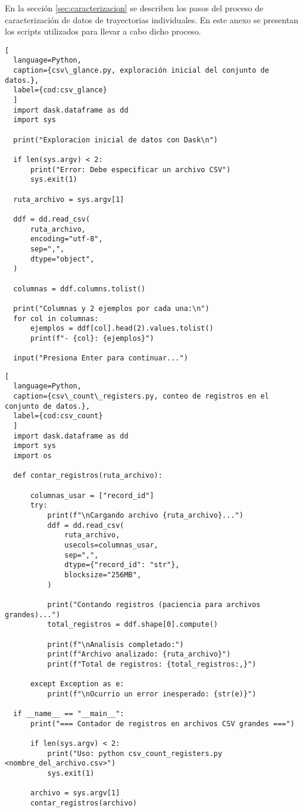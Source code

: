 \label{anexo:scripts}

En la sección \ref{sec:caracterizacion} se describen los pasos del proceso de caracterización de datos de trayectorias individuales. En este anexo se presentan los scripts utilizados para llevar a cabo dicho proceso.

\begin{lstlisting}[
  language=Python,
  caption={csv\_glance.py, exploración inicial del conjunto de datos.},
  label={cod:csv_glance}
  ]
  import dask.dataframe as dd
  import sys 

  print("Exploracion inicial de datos con Dask\n")

  if len(sys.argv) < 2:
      print("Error: Debe especificar un archivo CSV")
      sys.exit(1)

  ruta_archivo = sys.argv[1]

  ddf = dd.read_csv(
      ruta_archivo,
      encoding="utf-8",  
      sep=",",           
      dtype="object",    
  )

  columnas = ddf.columns.tolist()

  print("Columnas y 2 ejemplos por cada una:\n")
  for col in columnas:
      ejemplos = ddf[col].head(2).values.tolist()
      print(f"- {col}: {ejemplos}")

  input("Presiona Enter para continuar...")
\end{lstlisting}
\vfill

\begin{lstlisting}[
  language=Python,
  caption={csv\_count\_registers.py, conteo de registros en el conjunto de datos.},
  label={cod:csv_count}
  ] 
  import dask.dataframe as dd
  import sys
  import os

  def contar_registros(ruta_archivo):

      columnas_usar = ["record_id"]
      try:
          print(f"\nCargando archivo {ruta_archivo}...")
          ddf = dd.read_csv(
              ruta_archivo,
              usecols=columnas_usar,
              sep=",",
              dtype={"record_id": "str"},
              blocksize="256MB",
          )

          print("Contando registros (paciencia para archivos grandes)...")
          total_registros = ddf.shape[0].compute()

          print(f"\nAnalisis completado:")
          print(f"Archivo analizado: {ruta_archivo}")
          print(f"Total de registros: {total_registros:,}")

      except Exception as e:
          print(f"\nOcurrio un error inesperado: {str(e)}")

  if __name__ == "__main__":
      print("=== Contador de registros en archivos CSV grandes ===")

      if len(sys.argv) < 2:
          print("Uso: python csv_count_registers.py <nombre_del_archivo.csv>")
          sys.exit(1)

      archivo = sys.argv[1]
      contar_registros(archivo)
\end{lstlisting}
\vfill

